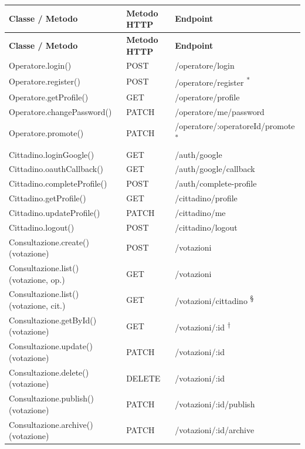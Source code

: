 \documentclass[12pt, a4paper]{article}
\begin{document}
\begin{longtable}{>{\ttfamily\small}p{} p{} >{\ttfamily\small}p{}}
  \toprule
  \normalfont\textbf{Classe / Metodo} & \textbf{Metodo HTTP} & \normalfont\textbf{Endpoint} \\
  \midrule
  \endfirsthead
  \toprule
  \normalfont\textbf{Classe / Metodo} & \textbf{Metodo HTTP} & \normalfont\textbf{Endpoint} \\
  \midrule
  \endhead
  \bottomrule
  \endfoot

  Operatore.login() & POST & /operatore/login \\
  Operatore.register() & POST & /operatore/register \textsuperscript{*} \\
  Operatore.getProfile() & GET & /operatore/profile \\
  Operatore.changePassword() & PATCH & /operatore/me/password \\
  Operatore.promote() & PATCH & /operatore/:operatoreId/promote \textsuperscript{*} \\
  \addlinespace
  Cittadino.loginGoogle() & GET & /auth/google \\
  Cittadino.oauthCallback() & GET & /auth/google/callback \\
  Cittadino.completeProfile() & POST & /auth/complete-profile \\
  Cittadino.getProfile() & GET & /cittadino/profile \\
  Cittadino.updateProfile() & PATCH & /cittadino/me \\
  Cittadino.logout() & POST & /cittadino/logout \\
  \addlinespace
  Consultazione.create() (votazione) & POST & /votazioni \\
  Consultazione.list() (votazione, op.) & GET & /votazioni \\
  Consultazione.list() (votazione, cit.) & GET & /votazioni/cittadino \textsuperscript{§} \\
  Consultazione.getById() (votazione) & GET & /votazioni/:id \textsuperscript{†} \\
  Consultazione.update() (votazione) & PATCH & /votazioni/:id \\
  Consultazione.delete() (votazione) & DELETE & /votazioni/:id \\
  Consultazione.publish() (votazione) & PATCH & /votazioni/:id/publish \\
  Consultazione.archive() (votazione) & PATCH & /votazioni/:id/archive \\

\end{longtable}
\end{document}
